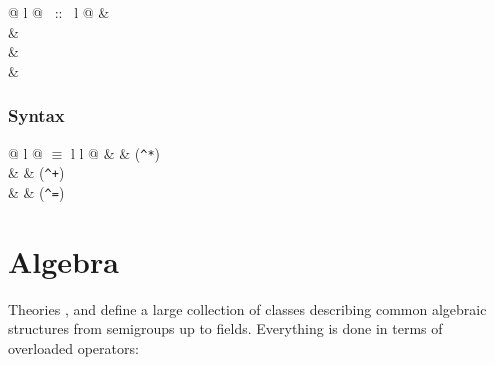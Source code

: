 \begin{isabellebody}
\begin{isamarkuptext}
\begin{tabular}{@ {} l @ {~::~} l @ {}}
 & \\
 & \\
 & \\
 & \\
\end{tabular}

\subsubsection*{Syntax}

\begin{tabular}{@ {} l @ {\quad$\equiv$\quad} l l @ {}}
 &  & (\verb$^*$)\\
 &  & (\verb$^+$)\\
 &  & (\verb$^=$)
\end{tabular}


\section{Algebra}

Theories ,  and  define a large collection of classes describing common algebraic
structures from semigroups up to fields. Everything is done in terms of
overloaded operators:


\end{isamarkuptext}
\end{isabellebody}

